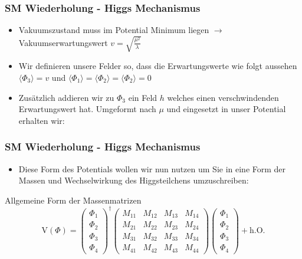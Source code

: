 \documentclass{beamer}
\begin{document}
\begin{frame}[t]
\frametitle{SM Wiederholung - Higgs Mechanismus }
\begin{itemize}
\item Vakuumszustand muss im  Potential Minimum liegen $\rightarrow$ Vakuumserwartungswert $v=\sqrt{\frac{\mu^2}{\lambda}}$
 \item Wir definieren unsere Felder so, dass die Erwartungswerte wie folgt aussehen $\langle \Phi_{3}\rangle=v$ und  $\langle \Phi_{1}\rangle=\langle \Phi_{2}\rangle=\langle \Phi_{2}\rangle=0$ 
 \item Zusätzlich addieren wir zu $\Phi_{3}$ ein Feld $h$ welches einen verschwindenden Erwartungswert hat. Umgeformt nach $\mu$ und eingesetzt in unser Potential erhalten wir:
 \end{itemize}
\end{frame}

\begin{frame}[t]
\frametitle{SM Wiederholung - Higgs Mechanismus }
\begin{itemize}
\item Diese Form des Potentials wollen wir nun nutzen um Sie in eine Form der Massen und Wechselwirkung des Higgsteilchens umzuschreiben:
\end{itemize}
\begin{block}{Allgemeine Form der Massenmatrizen}
\begin{equation*}
\text{V}(\Phi)=\left( \begin{array}{c} \Phi_{1}\\ \Phi_{2} \\ \Phi_{3} \\ \Phi_{4} \end{array}\right)^{\dagger}  \begin{pmatrix} M_{11}&M_{12}&M_{13}&M_{14}\\M_{21}&M_{22}&M_{23}&M_{24} \\ M_{31}&M_{32}&M_{33}&M_{34}\\ M_{41}&M_{42}&M_{43}&M_{44}\end{pmatrix}\left( \begin{array}{c} \Phi_{1}\\ \Phi_{2} \\ \Phi_{3} \\ \Phi_{4} \end{array}\right) + \text{h.O.}
\end{equation*}
\end{block}
\end{frame} 
\end{document}
